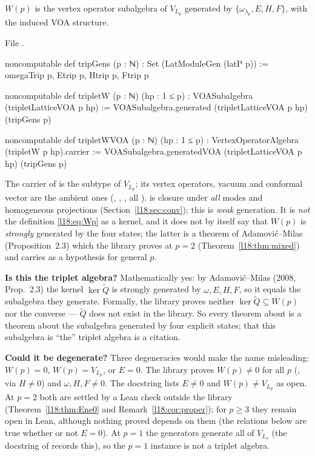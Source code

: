 \begin{definition}\label{l18:def:tripletW}
$W(p)$ is the vertex operator subalgebra of $V_{L_p}$ generated by
$\{\omega_{\lambda_p},E,H,F\}$, with the induced VOA structure.
\end{definition}
\noindent File .
\begin{leancode}
noncomputable def tripGens (p : ℕ) : Set (LatModuleGen (latP p)) :=
  {omegaTrip p, Etrip p, Htrip p, Ftrip p}

noncomputable def tripletW (p : ℕ) (hp : 1 ≤ p) : VOASubalgebra (tripletLatticeVOA p hp) :=
  VOASubalgebra.generated (tripletLatticeVOA p hp) (tripGens p)

noncomputable def tripletWVOA (p : ℕ) (hp : 1 ≤ p) :
    VertexOperatorAlgebra (tripletW p hp).carrier :=
  VOASubalgebra.generatedVOA (tripletLatticeVOA p hp) (tripGens p)
\end{leancode}
\begin{dictionary}
The carrier of  is the subtype  of
$V_{L_p}$; its vertex operators, vacuum and conformal vector are the ambient ones
(, , ,
all ).  is closure under \emph{all} modes and homogeneous
projections (Section~\ref{l18:sec:conv}); this is \emph{weak} generation. It is \emph{not} the
definition \eqref{l18:eq:Wp} as a kernel, and it does not by itself say that $W(p)$ is
\emph{strongly} generated by the four states; the latter is a theorem of Adamovi\'c--Milas
(Proposition~2.3) which the library proves at $p=2$ (Theorem~\ref{l18:thm:mixed}) and carries as
a hypothesis for general $p$.

\textbf{Is this the triplet algebra?} Mathematically yes: by Adamovi\'c--Milas (2008, Prop.~2.3)
the kernel $\ker\widetilde Q$ is strongly generated by $\omega,E,H,F$, so it equals the subalgebra they
generate. Formally, the library proves neither $\ker\widetilde Q\subseteq W(p)$ nor the converse ---
$\widetilde Q$ does not exist in the library. So every theorem about  is a theorem
about the subalgebra generated by four explicit states; that this subalgebra is ``the'' triplet
algebra is a citation.

\textbf{Could it be degenerate?} Three degeneracies would make the name misleading: $W(p)=0$,
$W(p)=V_{L_p}$, or $E=0$. The library proves $W(p)\ne0$ for all $p$
(, via $H\ne0$) and $\omega,H,F\ne0$. The docstring lists $E\ne0$ and
$W(p)\ne V_{L_p}$ as open. At $p=2$ both are settled by a Lean check outside the library
(Theorem~\ref{l18:thm:Ene0} and Remark~\ref{l18:cor:proper}); for $p\ge3$ they remain open in
Lean, although nothing proved depends on them (the relations below are true whether or not $E=0$).
At $p=1$ the generators generate all of $V_{L_1}$ (the docstring of 
records this), so the $p=1$ instance is not a triplet algebra.
\end{dictionary}
